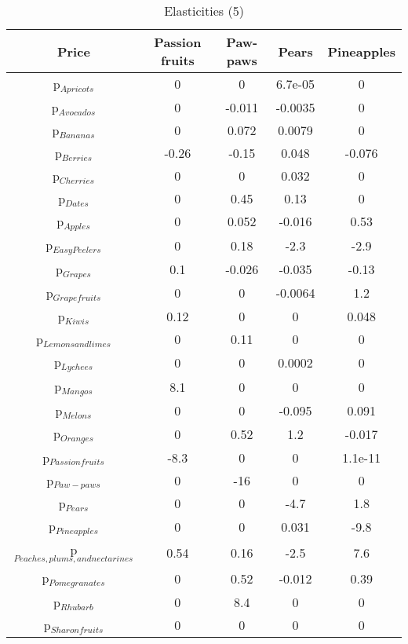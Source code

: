 \documentclass[11pt]{article}
\begin{document}
\begin{table}[h]
\caption{Elasticities (5)}
\label{Table: elasticities 5}
\begin{center}
\begin{tabular}{ccccc}
Price & Passion fruits & Paw-paws & Pears & Pineapples \\ \hline
p$_{Apricots}$ & 0 & 0 & 6.7e-05 & 0 \\ 
p$_{Avocados}$ & 0 & -0.011 & -0.0035 & 0 \\ 
p$_{Bananas}$ & 0 & 0.072 & 0.0079 & 0 \\ 
p$_{Berries}$ & -0.26 & -0.15 & 0.048 & -0.076 \\ 
p$_{Cherries}$ & 0 & 0 & 0.032 & 0 \\ 
p$_{Dates}$ & 0 & 0.45 & 0.13 & 0 \\ 
p$_{Apples}$ & 0 & 0.052 & -0.016 & 0.53 \\ 
p$_{Easy Peelers}$ & 0 & 0.18 & -2.3 & -2.9 \\ 
p$_{Grapes}$ & 0.1 & -0.026 & -0.035 & -0.13 \\ 
p$_{Grapefruits}$ & 0 & 0 & -0.0064 & 1.2 \\ 
p$_{Kiwis}$ & 0.12 & 0 & 0 & 0.048 \\ 
p$_{Lemons and limes}$ & 0 & 0.11 & 0 & 0 \\ 
p$_{Lychees}$ & 0 & 0 & 0.0002 & 0 \\ 
p$_{Mangos}$ & 8.1 & 0 & 0 & 0 \\ 
p$_{Melons}$ & 0 & 0 & -0.095 & 0.091 \\ 
p$_{Oranges}$ & 0 & 0.52 & 1.2 & -0.017 \\ 
p$_{Passion fruits}$ & -8.3 & 0 & 0 & 1.1e-11 \\ 
p$_{Paw-paws}$ & 0 & -16 & 0 & 0 \\ 
p$_{Pears}$ & 0 & 0 & -4.7 & 1.8 \\ 
p$_{Pineapples}$ & 0 & 0 & 0.031 & -9.8 \\ 
p$_{Peaches, plums, and nectarines}$ & 0.54 & 0.16 & -2.5 & 7.6 \\ 
p$_{Pomegranates}$ & 0 & 0.52 & -0.012 & 0.39 \\ 
p$_{Rhubarb}$ & 0 & 8.4 & 0 & 0 \\ 
p$_{Sharon fruits}$ & 0 & 0 & 0 & 0 \\ 
\end{tabular}
\end{center}
\end{table}
\end{document}
